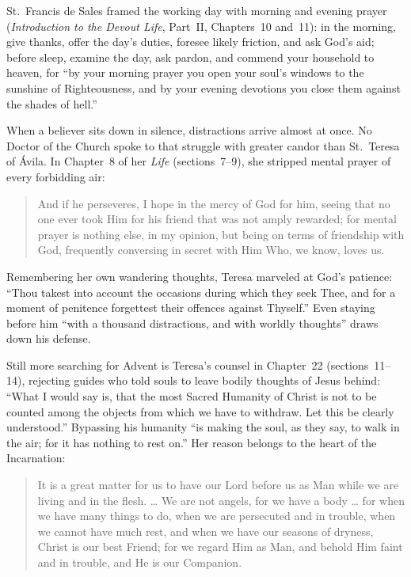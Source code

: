 St.~Francis de Sales framed the working day with morning and evening prayer (\textit{Introduction to the Devout Life}, Part~II, Chapters~10 and~11): in the morning, give thanks, offer the day's duties, foresee likely friction, and ask God's aid; before sleep, examine the day, ask pardon, and commend your household to heaven, for ``by your morning prayer you open your soul's windows to the sunshine of Righteousness, and by your evening devotions you close them against the shades of hell.''

When a believer sits down in silence, distractions arrive almost at once. No Doctor of the Church spoke to that struggle with greater candor than St.~Teresa of \'Avila. In Chapter~8 of her \textit{Life} (sections~7--9), she stripped mental prayer of every forbidding air:

\begin{quote}
And if he perseveres, I hope in the mercy of God for him, seeing that no one ever took Him for his friend that was not amply rewarded; for mental prayer is nothing else, in my opinion, but being on terms of friendship with God, frequently conversing in secret with Him Who, we know, loves us.
\end{quote}

Remembering her own wandering thoughts, Teresa marveled at God's patience: ``Thou takest into account the occasions during which they seek Thee, and for a moment of penitence forgettest their offences against Thyself.'' Even staying before him ``with a thousand distractions, and with worldly thoughts'' draws down his defense.

Still more searching for Advent is Teresa's counsel in Chapter~22 (sections~11--14), rejecting guides who told souls to leave bodily thoughts of Jesus behind: ``What I would say is, that the most Sacred Humanity of Christ is not to be counted among the objects from which we have to withdraw. Let this be clearly understood.'' Bypassing his humanity ``is making the soul, as they say, to walk in the air; for it has nothing to rest on.'' Her reason belongs to the heart of the Incarnation:

\begin{quote}
It is a great matter for us to have our Lord before us as Man while we are living and in the flesh. \ldots{} We are not angels, for we have a body \ldots{} for when we have many things to do, when we are persecuted and in trouble, when we cannot have much rest, and when we have our seasons of dryness, Christ is our best Friend; for we regard Him as Man, and behold Him faint and in trouble, and He is our Companion.
\end{quote}

